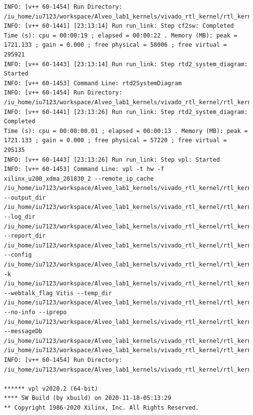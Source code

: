 \begin{lstlisting}
INFO: [v++ 60-1454] Run Directory: /iu_home/iu7123/workspace/Alveo_lab1_kernels/vivado_rtl_kernel/rtl_kernel_wizard_2_ex/exports/_x/link/run_link
INFO: [v++ 60-1441] [23:13:14] Run run_link: Step cf2sw: Completed
Time (s): cpu = 00:00:19 ; elapsed = 00:00:22 . Memory (MB): peak = 1721.133 ; gain = 0.000 ; free physical = 58006 ; free virtual = 295921
INFO: [v++ 60-1443] [23:13:14] Run run_link: Step rtd2_system_diagram: Started
INFO: [v++ 60-1453] Command Line: rtd2SystemDiagram
INFO: [v++ 60-1454] Run Directory: /iu_home/iu7123/workspace/Alveo_lab1_kernels/vivado_rtl_kernel/rtl_kernel_wizard_2_ex/exports/_x/link/run_link
INFO: [v++ 60-1441] [23:13:26] Run run_link: Step rtd2_system_diagram: Completed
Time (s): cpu = 00:00:00.01 ; elapsed = 00:00:13 . Memory (MB): peak = 1721.133 ; gain = 0.000 ; free physical = 57220 ; free virtual = 295135
INFO: [v++ 60-1443] [23:13:26] Run run_link: Step vpl: Started
INFO: [v++ 60-1453] Command Line: vpl -t hw -f xilinx_u200_xdma_201830_2 --remote_ip_cache /iu_home/iu7123/workspace/Alveo_lab1_kernels/vivado_rtl_kernel/rtl_kernel_wizard_2_ex/exports/.ipcache --output_dir /iu_home/iu7123/workspace/Alveo_lab1_kernels/vivado_rtl_kernel/rtl_kernel_wizard_2_ex/exports/_x/link/int --log_dir /iu_home/iu7123/workspace/Alveo_lab1_kernels/vivado_rtl_kernel/rtl_kernel_wizard_2_ex/exports/_x/logs/link --report_dir /iu_home/iu7123/workspace/Alveo_lab1_kernels/vivado_rtl_kernel/rtl_kernel_wizard_2_ex/exports/_x/reports/link --config /iu_home/iu7123/workspace/Alveo_lab1_kernels/vivado_rtl_kernel/rtl_kernel_wizard_2_ex/exports/_x/link/int/vplConfig.ini -k /iu_home/iu7123/workspace/Alveo_lab1_kernels/vivado_rtl_kernel/rtl_kernel_wizard_2_ex/exports/_x/link/int/kernel_info.dat --webtalk_flag Vitis --temp_dir /iu_home/iu7123/workspace/Alveo_lab1_kernels/vivado_rtl_kernel/rtl_kernel_wizard_2_ex/exports/_x/link --no-info --iprepo /iu_home/iu7123/workspace/Alveo_lab1_kernels/vivado_rtl_kernel/rtl_kernel_wizard_2_ex/exports/_x/link/int/xo/ip_repo/mycompany_com_kernel_rtl_kernel_wizard_2_1_0 --messageDb /iu_home/iu7123/workspace/Alveo_lab1_kernels/vivado_rtl_kernel/rtl_kernel_wizard_2_ex/exports/_x/link/run_link/vpl.pb /iu_home/iu7123/workspace/Alveo_lab1_kernels/vivado_rtl_kernel/rtl_kernel_wizard_2_ex/exports/_x/link/int/dr.bd.tcl
INFO: [v++ 60-1454] Run Directory: /iu_home/iu7123/workspace/Alveo_lab1_kernels/vivado_rtl_kernel/rtl_kernel_wizard_2_ex/exports/_x/link/run_link

****** vpl v2020.2 (64-bit)
**** SW Build (by xbuild) on 2020-11-18-05:13:29
** Copyright 1986-2020 Xilinx, Inc. All Rights Reserved.


\end{lstlisting}
